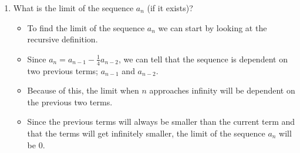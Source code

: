 \documentclass[12pt]{report}
\begin{document}
\begin{enumerate}[leftmargin=\labelsep]
\begin{enumerate}
\newpage 
            \item What is the limit of the sequence $a_n$ (if it exists)?
                \begin{tcolorbox}
                    \begin{itemize}[label={}]
                        \item To find the limit of the sequence $a_n$ we can start by looking at the recursive definition.
                        \item Since $a_n = a_{n-1} - \frac{1}{4}a_{n-2}$, we can tell that the sequence is dependent on two previous terms; $a_{n-1}$ and $a_{n-2}$.
                        \item Because of this, the limit when $n$ approaches infinity will be dependent on the previous two terms.
                        \item Since the previous terms will always be smaller than the current term and that the terms will get infinitely smaller, the limit of the sequence $a_n$ will be 0.
                    \end{itemize}
                \end{tcolorbox}
        \end{enumerate}

\newpage


\end{enumerate}
\end{document}
